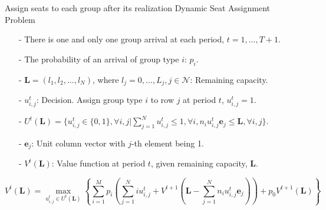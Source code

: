   \begin{frame}{Assign seats to each group after its realization}
    \centering
    Dynamic Seat Assignment Problem
    \small
    \begin{itemize}
    \item[-] There is one and only one group arrival at each period, $t = 1, \ldots, T+1$. 
    \item[-] The probability of an arrival of group type $i$: $p_i$.  
    \item[-] $\mathbf{L} = (l_1, l_2, \ldots, l_{N})$, where $l_j =0,\ldots, L_j, j\in \mathcal{N}$: Remaining capacity.
    \item[-] $u_{i,j}^{t}$: Decision. Assign group type $i$ to row $j$ at period $t$, $u_{i,j}^t =1$.
    \item[-] $U^{t}(\mathbf{L}) = \{u_{i,j}^{t} \in\{0,1\}, \forall i,j| \sum_{j=1}^{N} u_{i,j}^{t} \leq 1, \forall i, n_{i}u_{i,j}^{t}\mathbf{e}_j \leq \mathbf{L}, \forall i,j \}$.
    \item[-] $\mathbf{e}_j$: Unit column vector with $j$-th element being 1.
    \item[-] $V^{t}(\mathbf{L})$: Value function at period $t$, given remaining capacity, $\mathbf{L}$.
    \end{itemize}

    $$V^{t}(\mathbf{L}) = \max_{u_{i,j}^{t} \in U^{t}(\mathbf{L})}\left\{ \sum_{i=1}^{M} p_i ( \sum_{j=1}^{N} i u_{i,j}^{t} + V^{t+1}(\mathbf{L}- \sum_{j=1}^{N} n_i u_{i,j}^{t}\mathbf{e}_j)) + p_0 V^{t+1}(\mathbf{L})\right\}$$
    \small
\end{frame}





